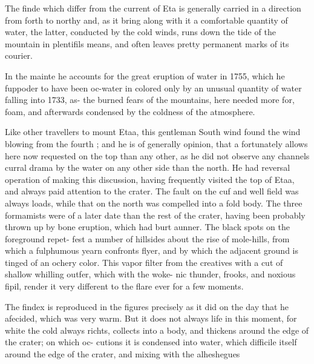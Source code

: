 The finde which differ from the current of Eta is generally carried in a direction from forth to northy and, as it bring along with it a comfortable quantity of water, the latter, conducted by the cold winds, runs down the tide of the mountain in plentifils means, and often leaves pretty permanent marks of its courier.\par\medskip
In the mainte he accounts for the great eruption of water in 1755, which he fuppoder to have been oc-water in colored only by an unusual quantity of water falling into 1733, as- the burned fears of the mountains, here needed more for, foam, and afterwards condensed by the coldness of the atmosphere.\par\medskip
Like other travellers to mount Etaa, this gentleman South wind found the wind blowing from the fourth ; and he is of generally opinion, that a fortunately allows here now requested on the top than any other, as he did not observe any channels curral drama by the water on any other side than the north. He had reversal operation of making this discussion, having frequently visited the top of Etaa, and always paid attention to the crater. The fault on the cuf and well field was always loads, while that on the north was compelled into a fold body. The three formamists were of a later date than the rest of the crater, having been probably thrown up by bone eruption, which had burt aunner. The black spots on the foreground repet- fest a number of hillsides about the rise of mole-hills, from which a fulphumous yearn confronts flyer, and by which the adjacent ground is tinged of an ochery color. This vapor filter from the creatives with a cut of shallow whilling outfer, which with the woke- nic thunder, frooks, and noxious fipil, render it very different to the flare ever for a few moments.\par\medskip
The findex is reproduced in the figures precisely as it did on the day that he afecided, which was very warm. But it does not always life in this moment, for white the cold always richts, collects into a body, and thickens around the edge of the crater; on which oc- cutions it is condensed into water, which difficile itself around the edge of the crater, and mixing with the alheshegues\par\medskip
